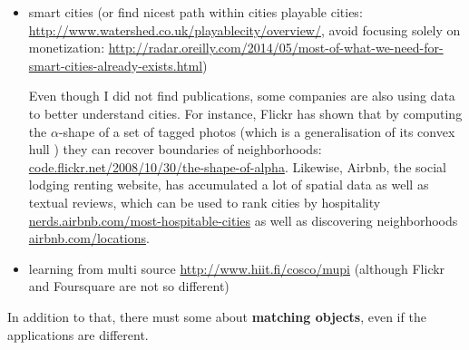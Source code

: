 \begin{itemize}
\item smart cities \autocite{HelsinkiSCC11, Eunoia13, SmartCities13} (or
find nicest path within cities \cite{Quercia2014}
playable cities: \url{http://www.watershed.co.uk/playablecity/overview/},
\ie{} avoid focusing solely on monetization:
\url{http://radar.oreilly.com/2014/05/most-of-what-we-need-for-smart-cities-already-exists.html})

Even though I did not find publications, some companies are also using data to
better understand cities. For instance, Flickr has shown that by computing the
$\alpha$-shape of a set of tagged photos (which is a generalisation of its
convex hull \autocite{AlphaShape83}) they can recover boundaries of
neighborhoods: \href{http://code.flickr.net/2008/10/30/the-shape-of-alpha/}%
{\url{code.flickr.net/2008/10/30/the-shape-of-alpha}}.  Likewise, Airbnb, the
social lodging renting website, has accumulated a lot of spatial data as well
as textual reviews, which can be used to rank cities by hospitality
\href{http://nerds.airbnb.com/most-hospitable-cities/}%
{\url{nerds.airbnb.com/most-hospitable-cities}} as well as discovering
neighborhoods
\href{https://www.airbnb.com/locations}{\url{airbnb.com/locations}}.

\item learning from multi source \url{http://www.hiit.fi/cosco/mupi} (although
Flickr and Foursquare are not so different)

\end{itemize}

In addition to that,
there must some about \textbf{matching objects}, even if the applications are
different.
